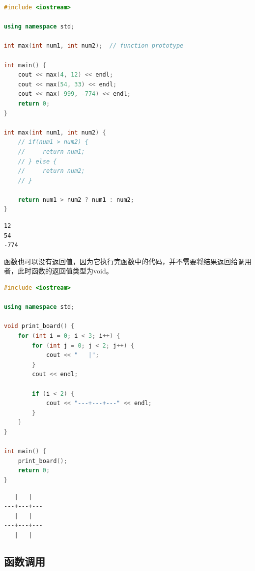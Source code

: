 \vspace{0.5cm}


\begin{lstlisting}[language=C++]
#include <iostream>

using namespace std;

int max(int num1, int num2);  // function prototype

int main() {
	cout << max(4, 12) << endl;
	cout << max(54, 33) << endl;
	cout << max(-999, -774) << endl;
	return 0;
}

int max(int num1, int num2) {
	// if(num1 > num2) {
	//     return num1;
	// } else {
	//     return num2;
	// }

	return num1 > num2 ? num1 : num2;
}
\end{lstlisting}

\begin{tcolorbox}
	\begin{verbatim}
12
54
-774
	\end{verbatim}
\end{tcolorbox}

函数也可以没有返回值，因为它执行完函数中的代码，并不需要将结果返回给调用者，此时函数的返回值类型为void。\\


\begin{lstlisting}[language=C++]
#include <iostream>

using namespace std;

void print_board() {
	for (int i = 0; i < 3; i++) {
		for (int j = 0; j < 2; j++) {
			cout << "   |";
		}
		cout << endl;

		if (i < 2) {
			cout << "---+---+---" << endl;
		}
	}
}

int main() {
	print_board();
	return 0;
}
\end{lstlisting}

\begin{tcolorbox}
	\begin{verbatim}
   |   |
---+---+---
   |   |
---+---+---
   |   |
	\end{verbatim}
\end{tcolorbox}

\vspace{0.5cm}

\subsection{函数调用}

